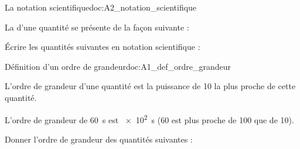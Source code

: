 \begin{doc}{La notation scientifique}{doc:A2_notation_scientifique}
  \begin{importants}
  La  d'une quantité se présente de la façon suivante :
  \begin{center}
    \qq{}
    \qq{}
  \end{center}
  \vspace*{-30pt} \hspace*{4pt}
  \end{importants}
\end{doc}

\numeroQuestion Écrire les quantités suivantes en notation scientifique :
  



\begin{doc}{Définition d'un ordre de grandeur}{doc:A1_def_ordre_grandeur}

  \vAligne{-36pt}
  \begin{importants}
    L'ordre de grandeur d'une quantité est la puissance de 10 la plus proche de cette quantité.
  \end{importants}
  \exemple L'ordre de grandeur de \qty{60}{\s} est \qty{e2}{\s} (60 est plus proche de 100 que de 10). 
\end{doc}


\newpage
\vspace*{-28pt}
\numeroQuestion Donner l'ordre de grandeur des quantités suivantes :

